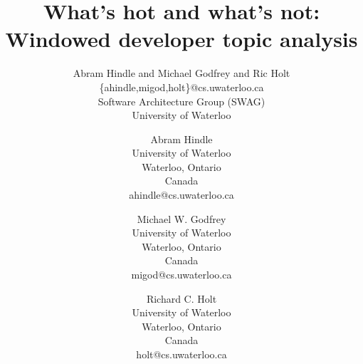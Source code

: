 \documentclass[times, 10pt,twocolumn]{article}
\author{Abram Hindle and Michael Godfrey and Ric Holt \\
\{ahindle,migod,holt\}@cs.uwaterloo.ca\\
Software Architecture Group (SWAG)\\
University of Waterloo\\
}
\title{What's hot and what's not:\\Windowed developer topic analysis}
\begin{document}
\newcommand{\affaddr}[1]{#1}
\newcommand{\aemail}[1]{#1}
\author{
Abram Hindle\\
\affaddr{University of Waterloo}\\
\affaddr{Waterloo, Ontario}\\
\affaddr{Canada}\\
\aemail{ahindle@cs.uwaterloo.ca}
\and
Michael W. Godfrey\\
\affaddr{University of Waterloo}\\
\affaddr{Waterloo, Ontario}\\
\affaddr{Canada}\\
\aemail{migod@cs.uwaterloo.ca}
\and
Richard C. Holt\\
\affaddr{University of Waterloo}\\
\affaddr{Waterloo, Ontario}\\
\affaddr{Canada}\\
\aemail{holt@cs.uwaterloo.ca}
}
\end{document}
